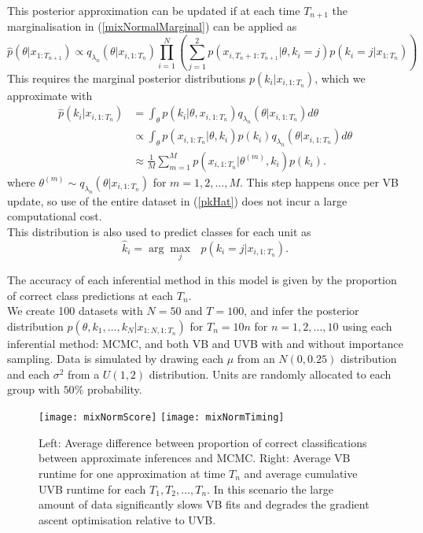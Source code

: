 \documentclass[12pt,a4paper]{article}\usepackage[]{graphicx}\usepackage[]{color}
\begin{document}
This posterior approximation can be updated if at each time $T_{n+1}$ the marginalisation in (\ref{mixNormalMarginal}) can be applied as
\begin{equation}
\label{mixNormalUpdate}
\hat{p}(\theta | x_{1:T_{n+1}}) \propto q_{\lambda_{n}}(\theta | x_{i, 1:T_{n}}) \prod_{i=1}^N \left( \sum_{j=1}^2 p(x_{i, T_n+1:T_{n+1}} | \theta, k_i = j) p(k_i = j | x_{1:T_n}) \right)
\end{equation}
This requires the marginal posterior distributions $p(k_i | x_{i, 1:T_{n}})$, which we approximate with
\begin{align}
\hat{p}(k_i | x_{i, 1:T_{n}}) &= \int_{\theta} p(k_i | \theta, x_{i, 1:T_{n}})q_{\lambda_{n}}(\theta | x_{i, 1:T_{n}}) d\theta \nonumber \\
&\propto \int_{\theta} p(x_{i, 1:T_n} | \theta, k_i) p(k_i) q_{\lambda_{n}}(\theta | x_{i, 1:T_{n}}) d\theta \nonumber \\
&\approx \frac{1}{M} \sum_{m=1}^M p(x_{i, 1:T_n} | \theta^{(m)} , k_i) p(k_i). \label{pkHat}
\end{align}
where $\theta^{(m)} \sim q_{\lambda_{n}}(\theta | x_{i, 1:T_{n}})$ for $m = 1, 2, \dots, M$. This step happens once per VB update, so use of the entire dataset in (\ref{pkHat}) does not incur a large computational cost.
\\

This distribution is also used to predict classes for each unit as
\begin{equation}
\hat{k}_i = \arg \underset{j}{\max}\mbox{ } p(k_i = j | x_{i, 1:T_n}).
\end{equation}

The accuracy of each inferential method in this model is given by the proportion of correct class predictions at each $T_n$.
\\

We create 100 datasets with $N = 50$ and $T = 100$, and infer the posterior distribution $p(\theta, k_1, \dots, k_N | x_{1:N, 1:T_n})$ for $T_n = 10n$ for $n = 1, 2, \dots, 10$ using each inferential method: MCMC, and both VB and UVB with and without importance sampling. Data is simulated by drawing each $\mu$ from an $N(0, 0.25)$ distribution and each $\sigma^2$ from a $U(1, 2)$ distribution. Units are randomly allocated to each group with $50\%$ probability.

\begin{figure}%
    \centering
    {{\texttt{[image: mixNormScore]} }}%
    \qquad
    {{\texttt{[image: mixNormTiming]} }}%
    \caption{Left: Average difference between proportion of correct classifications between approximate inferences and MCMC. Right: Average VB runtime for one approximation at time $T_n$ and average cumulative UVB runtime for each $T_1, T_2, \dots, T_n$. In this scenario the large amount of data significantly slows VB fits and degrades the gradient ascent optimisation relative to UVB.}%
    \label{fig:mixnormResults}%
\end{figure}



\end{document}
